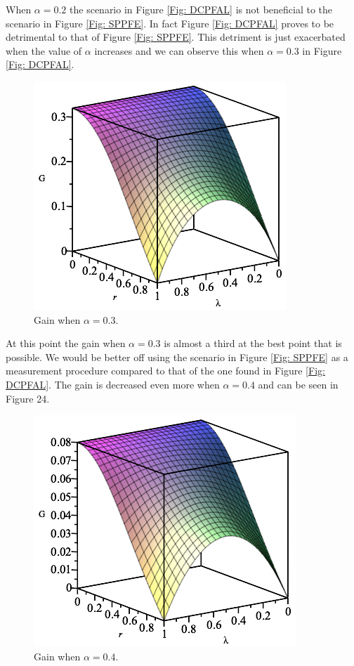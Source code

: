\documentclass[twocolumn]{article}
\begin{document}
\par \noindent
When $\alpha=0.2$ the scenario in Figure \ref{Fig: DCPFAL} is not beneficial to the scenario in Figure \ref{Fig: SPPFE}. In fact Figure \ref{Fig: DCPFAL} proves to be detrimental to that of Figure \ref{Fig: SPPFE}. This detriment is just exacerbated when the value of $\alpha$ increases and we can observe this when $\alpha=0.3$ in Figure \ref{Fig: DCPFAL}.
\newpage
\begin{figure}
    \centering
    \includegraphics[scale=0.60]{Phase-Flip-Two-Channel-Alpha=03-Gain.png}
    \caption{\footnotesize{Gain when $\alpha=0.3$.}}
    \label{Fig: DCPFA03G}
\end{figure}
\par \noindent
At this point the gain when $\alpha=0.3$ is almost a third at the best point that is possible. We would be better off using the scenario in Figure \ref{Fig: SPPFE} as a measurement procedure compared to that of the one found in Figure \ref{Fig: DCPFAL}. The gain is decreased even more when $\alpha=0.4$ and can be seen in Figure 24.
\begin{figure}[ht]
    \centering
    \includegraphics[scale=0.60]{Phase-Flip-Two-Channel-Alpha=04-Gain.png}
    \caption{\footnotesize{Gain when $\alpha=0.4$.}}
    \label{Fig: DCPFA04G}
\end{figure}
\end{document}
